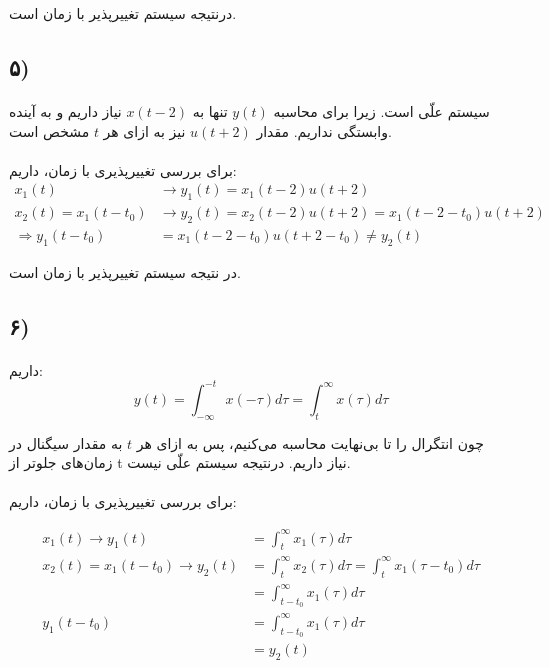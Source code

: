 \documentclass{article}
\begin{document}
	درنتیجه سیستم تغییرپذیر با زمان است.

	\subsection*{۵)}
	\paragraph*{}

	سیستم علّی است. زیرا برای محاسبه
	$y(t)$
	تنها به
	$x(t-2)$
	نیاز داریم و به آینده وابستگی نداریم. مقدار
	$u(t+2)$
	نیز به ازای هر
	$t$
	مشخص است.
	\paragraph*{}

	برای بررسی تغییرپذیری با زمان، داریم:
	\begin{align*}
		x_1(t) &\rightarrow y_1(t) = x_1(t - 2)u(t+2) \\
		x_2(t) = x_1(t - t_0) &\rightarrow y_2(t) = x_2(t-2)u(t+2) = x_1(t-2-t_0)u(t+2) \\
		\Rightarrow y_1(t-t_0) &= x_1(t-2-t_0)u(t+2-t_0) \ne y_2(t)
	\end{align*}

	در نتیجه سیستم تغییرپذیر با زمان است.

	\subsection*{۶)}
	\paragraph*{}
	داریم:
	\begin{equation*}
		y(t) = \int_{- \infty}^{-t} x(- \tau) d \tau = \int_{t}^{\infty} x(\tau) d\tau
	\end{equation*}

	چون انتگرال را تا بی‌نهایت محاسبه می‌کنیم، پس به ازای هر $t$ به مقدار سیگنال در زمان‌های جلوتر از t نیاز داریم. درنتیجه سیستم علّی نیست.

	\paragraph*{}
	برای بررسی تغییرپذیری با زمان، داریم:

	\begin{align*}
		x_1(t) \rightarrow y_1(t) &= \int_{t}^{\infty} x_1(\tau) d\tau \\
		x_2(t) = x_1(t-t_0) \rightarrow y_2(t) &= \int_{t}^{\infty} x_2(\tau) d\tau
		= \int_{t}^{\infty} x_1(\tau - t_0) d\tau \\
		&= \int_{t - t_0}^{\infty} x_1(\tau) d\tau \\
		y_1(t-t_0) &= \int_{t-t_0}^{\infty} x_1(\tau) d\tau \\
		&= y_2(t)
	\end{align*}
\end{document}
